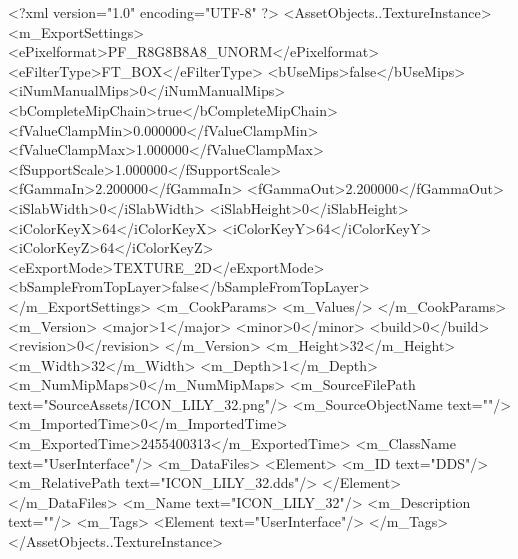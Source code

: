 <?xml version="1.0" encoding="UTF-8" ?>
<AssetObjects..TextureInstance>
	<m_ExportSettings>
		<ePixelformat>PF_R8G8B8A8_UNORM</ePixelformat>
		<eFilterType>FT_BOX</eFilterType>
		<bUseMips>false</bUseMips>
		<iNumManualMips>0</iNumManualMips>
		<bCompleteMipChain>true</bCompleteMipChain>
		<fValueClampMin>0.000000</fValueClampMin>
		<fValueClampMax>1.000000</fValueClampMax>
		<fSupportScale>1.000000</fSupportScale>
		<fGammaIn>2.200000</fGammaIn>
		<fGammaOut>2.200000</fGammaOut>
		<iSlabWidth>0</iSlabWidth>
		<iSlabHeight>0</iSlabHeight>
		<iColorKeyX>64</iColorKeyX>
		<iColorKeyY>64</iColorKeyY>
		<iColorKeyZ>64</iColorKeyZ>
		<eExportMode>TEXTURE_2D</eExportMode>
		<bSampleFromTopLayer>false</bSampleFromTopLayer>
	</m_ExportSettings>
	<m_CookParams>
		<m_Values/>
	</m_CookParams>
	<m_Version>
		<major>1</major>
		<minor>0</minor>
		<build>0</build>
		<revision>0</revision>
	</m_Version>
	<m_Height>32</m_Height>
	<m_Width>32</m_Width>
	<m_Depth>1</m_Depth>
	<m_NumMipMaps>0</m_NumMipMaps>
	<m_SourceFilePath text="SourceAssets/ICON_LILY_32.png"/>
	<m_SourceObjectName text=""/>
	<m_ImportedTime>0</m_ImportedTime>
	<m_ExportedTime>2455400313</m_ExportedTime>
	<m_ClassName text="UserInterface"/>
	<m_DataFiles>
		<Element>
			<m_ID text="DDS"/>
			<m_RelativePath text="ICON_LILY_32.dds"/>
		</Element>
	</m_DataFiles>
	<m_Name text="ICON_LILY_32"/>
	<m_Description text=""/>
	<m_Tags>
		<Element text="UserInterface"/>
	</m_Tags>
</AssetObjects..TextureInstance>

